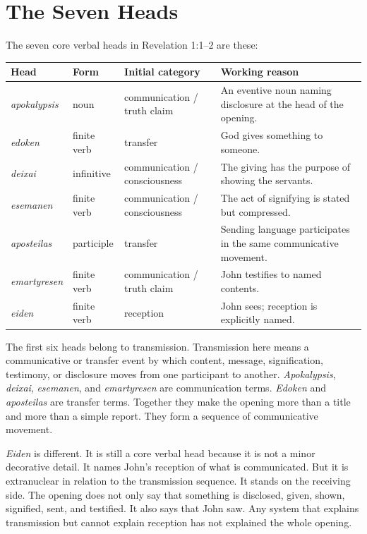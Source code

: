 \section{The Seven Heads}

The seven core verbal heads in Revelation 1:1--2 are these:

\begin{center}
\begin{longtable}{@{}L{0.16\textwidth}L{0.2\textwidth}L{0.2\textwidth}L{0.32\textwidth}@{}}
\toprule
Head & Form & Initial category & Working reason \\
\midrule
\textit{apokalypsis} & noun & communication / truth claim & An eventive noun naming disclosure at the head of the opening. \\
\textit{edoken} & finite verb & transfer & God gives something to someone. \\
\textit{deixai} & infinitive & communication / consciousness & The giving has the purpose of showing the servants. \\
\textit{esemanen} & finite verb & communication / consciousness & The act of signifying is stated but compressed. \\
\textit{aposteilas} & participle & transfer & Sending language participates in the same communicative movement. \\
\textit{emartyresen} & finite verb & communication / truth claim & John testifies to named contents. \\
\textit{eiden} & finite verb & reception & John sees; reception is explicitly named. \\
\bottomrule
\end{longtable}
\end{center}

The first six heads belong to transmission. Transmission here means a communicative or transfer event by which content, message, signification, testimony, or disclosure moves from one participant to another. \textit{Apokalypsis}, \textit{deixai}, \textit{esemanen}, and \textit{emartyresen} are communication terms. \textit{Edoken} and \textit{aposteilas} are transfer terms. Together they make the opening more than a title and more than a simple report. They form a sequence of communicative movement.

\textit{Eiden} is different. It is still a core verbal head because it is not a minor decorative detail. It names John's reception of what is communicated. But it is extranuclear in relation to the transmission sequence. It stands on the receiving side. The opening does not only say that something is disclosed, given, shown, signified, sent, and testified. It also says that John saw. Any system that explains transmission but cannot explain reception has not explained the whole opening.

